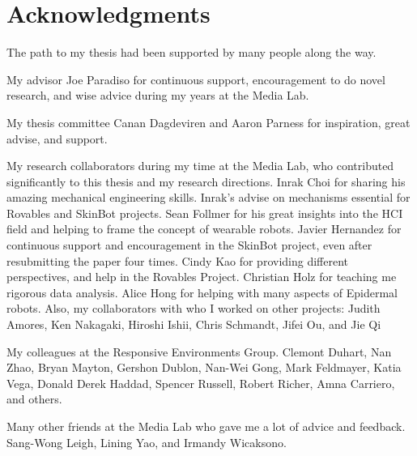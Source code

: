 
\readerpage

\cleardoublepage

% 

\cleardoublepage

\section*{Acknowledgments}
The path to my thesis had been supported by many people along the way.

My advisor Joe Paradiso for continuous support, encouragement to do novel research, and wise advice during my years at the Media Lab.

My thesis committee Canan Dagdeviren and Aaron Parness for inspiration, great advise, and support.

My research collaborators during my time at the Media Lab, who contributed significantly to this thesis and my research directions. Inrak Choi for sharing his amazing mechanical engineering skills. Inrak's advise on mechanisms essential for Rovables and SkinBot projects.  Sean Follmer for his great insights into the HCI field and helping to frame the concept of wearable robots. Javier Hernandez for continuous support and encouragement in the SkinBot project, even after resubmitting the paper four times. Cindy Kao for providing different perspectives, and help in the Rovables Project. Christian Holz for teaching me rigorous data analysis. Alice Hong for helping with many aspects of Epidermal robots. Also, my collaborators with who I worked on other projects: Judith Amores, Ken Nakagaki, Hiroshi Ishii, Chris Schmandt, Jifei Ou, and Jie Qi

My colleagues at the Responsive Environments Group. Clemont Duhart, Nan Zhao, Bryan Mayton, Gershon Dublon, Nan-Wei Gong, Mark Feldmayer, Katia Vega, Donald Derek Haddad, Spencer Russell, Robert Richer,  Amna Carriero, and others. 

Many other friends at the Media Lab who gave me a lot of advice and feedback. Sang-Wong Leigh, Lining Yao, and Irmandy Wicaksono. 

